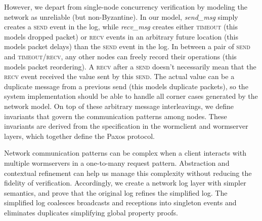 However, we depart from single-node concurrency verification by modeling the network as unreliable (but non-Byzantine). In our model, \textit{send\_msg} simply creates a \textsc{send} event in the log, while \textit{recv\_msg} creates either \textsc{timeout} (this models dropped packet) or \textsc{recv} events in an arbitrary future location (this models packet delays) than the \textsc{send} event in the log. In between a pair of \textsc{send} and \textsc{timeout/recv}, any other nodes can freely record their operations (this models packet reordering). A \textsc{recv} after a \textsc{send} doesn't necessarily mean that the \textsc{recv} event received the value sent by this \textsc{send}. The actual value can be a duplicate message from a previous send (this models duplicate packets), so the system implementation should be able to handle all corner cases generated by the network model. On top of these arbitrary message interleavings, we define invariants that govern the \sysname{} communication patterns among nodes. These invariants are derived from the specification in the wormclient and wormserver layers, which together define the Paxos protocol.






Network communication patterns can be complex when a client interacts with multiple wormservers in a one-to-many request pattern.
Abstraction and contextual refinement can help us manage this complexity without reducing the fidelity of verification.
Accordingly, we create a network log layer with simpler semantics, and prove that the original log refines the simplified log.
The simplified log coalesces broadcasts and receptions into singleton events and eliminates duplicates simplifying global property proofs.

